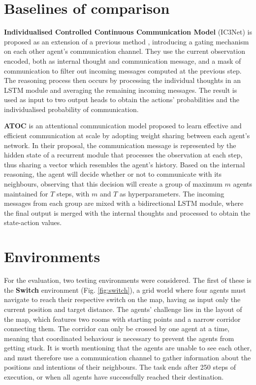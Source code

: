 \documentclass[a4paper,singleside,12pt]{report} %
\begin{document}
\section{Baselines of comparison}\label{Baselines}
\textbf{Individualised Controlled Continuous Communication Model} (IC3Net)\cite{IC3NETSingh2018LearningWT} is proposed as an extension of a previous method \cite{Sukhbaatar2016LearningMC}, introducing a gating mechanism on each other agent's communication channel. They use the current observation encoded, both as internal thought and communication message, and a mask of communication to filter out incoming messages computed at the previous step. The reasoning process then occurs by processing the individual thoughts in an LSTM module and averaging the remaining incoming messages. The result is used as input to two output heads to obtain the actions' probabilities and the individualised probability of communication.

\textbf{ATOC} \cite{ATOCJiang2018LearningAC} is an attentional communication model proposed to learn effective and efficient communication at scale by adopting weight sharing between each agent's network. In their proposal, the communication message is represented by the hidden state of a recurrent module that processes the observation at each step, thus sharing a vector which resembles the agent's history. Based on the internal reasoning, the agent will decide whether or not to communicate with its neighbours, observing that this decision will create a group of maximum $m$ agents maintained for $T$ steps, with $m$ and $T$ as hyperparameters. The incoming messages from each group are mixed with a bidirectional LSTM module, where the final output is merged with the internal thoughts and processed to obtain the state-action values.
 
\section{Environments}\label{Environments}

For the evaluation, two testing environments were considered. The first of these is the \textbf{Switch} environment \cite{magym} (Fig. \ref{fig:switch}), a grid world where four agents must navigate to reach their respective switch on the map, having as input only the current position and target distance. The agents' challenge lies in the layout of the map, which features two rooms with starting points and a narrow corridor connecting them. The corridor can only be crossed by one agent at a time, meaning that coordinated behaviour is necessary to prevent the agents from getting stuck. It is worth mentioning that the agents are unable to see each other, and must therefore use a communication channel to gather information about the positions and intentions of their neighbours. The task ends after 250 steps of execution, or when all agents have successfully reached their destination. 
\end{document}
